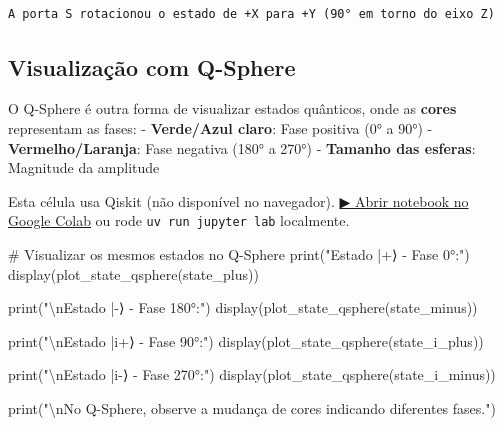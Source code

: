 \documentclass[
  brazilian,
]{report}
\newenvironment{Shaded}{\begin{snugshade}}{\end{snugshade}}
\newcommand{\BuiltInTok}[1]{\textcolor[rgb]{0.00,0.23,0.31}{#1}}
\newcommand{\CharTok}[1]{\textcolor[rgb]{0.13,0.47,0.30}{#1}}
\newcommand{\CommentTok}[1]{\textcolor[rgb]{0.37,0.37,0.37}{#1}}
\newcommand{\NormalTok}[1]{\textcolor[rgb]{0.00,0.23,0.31}{#1}}
\newcommand{\StringTok}[1]{\textcolor[rgb]{0.13,0.47,0.30}{#1}}
\begin{document}
\begin{verbatim}

A porta S rotacionou o estado de +X para +Y (90° em torno do eixo Z)
\end{verbatim}

\subsection{Visualização com
Q-Sphere}\label{visualizauxe7uxe3o-com-q-sphere}

O Q-Sphere é outra forma de visualizar estados quânticos, onde as
\textbf{cores} representam as fases: - \textbf{Verde/Azul claro}: Fase
positiva (0° a 90°) - \textbf{Vermelho/Laranja}: Fase negativa (180° a
270°) - \textbf{Tamanho das esferas}: Magnitude da amplitude

\begin{tcolorbox}[enhanced jigsaw, arc=.35mm, bottomrule=.15mm, bottomtitle=1mm, breakable, colback=white, colbacktitle=quarto-callout-warning-color!10!white, colframe=quarto-callout-warning-color-frame, coltitle=black, left=2mm, leftrule=.75mm, opacityback=0, opacitybacktitle=0.6, rightrule=.15mm, title=\textcolor{quarto-callout-warning-color}{\faExclamationTriangle}\hspace{0.5em}{⚛️ Célula Qiskit --- execute no Colab ou localmente}, titlerule=0mm, toprule=.15mm, toptitle=1mm]

Esta célula usa Qiskit (não disponível no navegador).
\href{https://colab.research.google.com/github/maxwellamaral/aula-quantum/blob/main/notebooks/00b-phases.ipynb}{▶
Abrir notebook no Google Colab} ou rode \texttt{uv\ run\ jupyter\ lab}
localmente.

\begin{Shaded}
\begin{Highlighting}[]

\CommentTok{\# Visualizar os mesmos estados no Q{-}Sphere}
\BuiltInTok{print}\NormalTok{(}\StringTok{"Estado |+⟩ {-} Fase 0°:"}\NormalTok{)}
\NormalTok{display(plot\_state\_qsphere(state\_plus))}

\BuiltInTok{print}\NormalTok{(}\StringTok{"}\CharTok{\textbackslash{}n}\StringTok{Estado |{-}⟩ {-} Fase 180°:"}\NormalTok{)}
\NormalTok{display(plot\_state\_qsphere(state\_minus))}

\BuiltInTok{print}\NormalTok{(}\StringTok{"}\CharTok{\textbackslash{}n}\StringTok{Estado |i+⟩ {-} Fase 90°:"}\NormalTok{)}
\NormalTok{display(plot\_state\_qsphere(state\_i\_plus))}

\BuiltInTok{print}\NormalTok{(}\StringTok{"}\CharTok{\textbackslash{}n}\StringTok{Estado |i{-}⟩ {-} Fase 270°:"}\NormalTok{)}
\NormalTok{display(plot\_state\_qsphere(state\_i\_minus))}

\BuiltInTok{print}\NormalTok{(}\StringTok{"}\CharTok{\textbackslash{}n}\StringTok{No Q{-}Sphere, observe a mudança de cores indicando diferentes fases."}\NormalTok{)}
\end{Highlighting}
\end{Shaded}

\end{tcolorbox}
\end{document}

